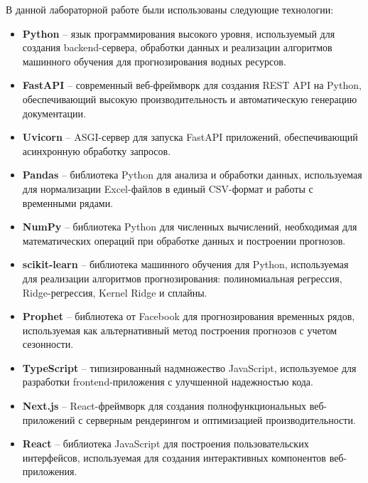 В данной лабораторной работе были использованы следующие технологии:

\begin{itemize}
    \item \textbf{Python} -- язык программирования высокого уровня, используемый для создания backend-сервера, обработки данных и реализации алгоритмов машинного обучения для прогнозирования водных ресурсов.
    
    \item \textbf{FastAPI} -- современный веб-фреймворк для создания REST API на Python, обеспечивающий высокую производительность и автоматическую генерацию документации.
    
    \item \textbf{Uvicorn} -- ASGI-сервер для запуска FastAPI приложений, обеспечивающий асинхронную обработку запросов.
    
    \item \textbf{Pandas} -- библиотека Python для анализа и обработки данных, используемая для нормализации Excel-файлов в единый CSV-формат и работы с временными рядами.
    
    \item \textbf{NumPy} -- библиотека Python для численных вычислений, необходимая для математических операций при обработке данных и построении прогнозов.
    
    \item \textbf{scikit-learn} -- библиотека машинного обучения для Python, используемая для реализации алгоритмов прогнозирования: полиномиальная регрессия, Ridge-регрессия, Kernel Ridge и сплайны.
    
    \item \textbf{Prophet} -- библиотека от Facebook для прогнозирования временных рядов, используемая как альтернативный метод построения прогнозов с учетом сезонности.
    
    \item \textbf{TypeScript} -- типизированный надмножество JavaScript, используемое для разработки frontend-приложения с улучшенной надежностью кода.
    
    \item \textbf{Next.js} -- React-фреймворк для создания полнофункциональных веб-приложений с серверным рендерингом и оптимизацией производительности.
    
    \item \textbf{React} -- библиотека JavaScript для построения пользовательских интерфейсов, используемая для создания интерактивных компонентов веб-приложения.
    

\end{itemize}
